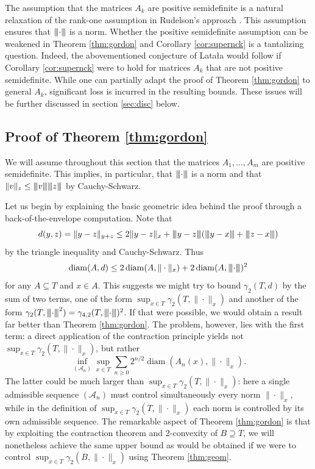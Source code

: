 \documentclass[10pt,reqno]{amsart}
\theoremstyle{definition}
\numberwithin{equation}{section}
\numberwithin{figure}{section}
\numberwithin{table}{section}
\newcommand{\diam}{\mathop{\mathrm{diam}}}
\newcommand{\mynegspace}{\hspace{-0.12em}}
\newcommand{\vvv}{\rvert\mynegspace\rvert\mynegspace\rvert}
\newcommand{\nnn}[1]{{\vvv #1 \vvv}}
\begin{document}
The assumption that the matrices $A_k$ are positive semidefinite is a 
natural relaxation of the rank-one assumption in Rudelson's approach 
\cite{Rud96}. This assumption ensures that $\nnn{\cdot}$ is 
a norm. Whether the positive semidefinite assumption can be weakened in 
Theorem \ref{thm:gordon} and Corollary \ref{cor:supernck} is a tantalizing 
question. Indeed, the abovementioned conjecture of Lata{\l}a \cite{vH16b} 
would follow if Corollary \ref{cor:supernck} were to hold for matrices 
$A_k$ that are not positive semidefinite. While one can partially adapt 
the proof of Theorem \ref{thm:gordon} to general $A_k$, significant loss 
is incurred in the resulting bounds. These issues will be further 
discussed in section \ref{sec:disc} below.

\subsection{Proof of Theorem \ref{thm:gordon}}

We will assume throughout this section that the matrices $A_1,\ldots,A_m$ 
are positive semidefinite. This implies, in particular, that $\nnn{\cdot}$ 
is a norm and that $\|v\|_z\le \nnn{v}\nnn{z}$ by Cauchy-Schwarz.

Let us begin by explaining the basic geometric idea behind the proof 
through a back-of-the-envelope computation. Note that
$$
	d(y,z) = \|y-z\|_{y+z} \le 2\|y-z\|_x + 
	\nnn{y-z}(\nnn{y-x}+\nnn{z-x})
$$
by the triangle inequality and Cauchy-Schwarz. Thus
$$
	\diam(A,d) \le 2\diam(A,\|\cdot\|_x) + 2\diam(A,\nnn{\cdot})^2
$$
for any $A\subseteq T$ and $x\in A$.
This suggests we might try to bound $\gamma_2(T,d)$ by the sum of two 
terms, one of the form $\sup_{x\in T}\gamma_2(T,\|\cdot\|_x)$ and another 
of the form $\gamma_2(T,\nnn{\cdot}^2)=\gamma_{4,2}(T,\nnn{\cdot})^2$. If 
that were possible, we would obtain a result far better than Theorem 
\ref{thm:gordon}. The problem, however, lies with the first term: 
a direct 
application of the contraction principle yields not 
$\sup_{x\in T}\gamma_2(T,\|\cdot\|_x)$, but rather 
$$
	\inf_{(\mathcal{A}_n)}
	\sup_{x\in T}\sum_{n\ge 0}2^{n/2}\diam(A_n(x),\|\cdot\|_x).
$$
The latter could be much larger than $\sup_{x\in T}\gamma_2(T,\|\cdot\|_x)$:
here a single admissible sequence $(\mathcal{A}_n)$ 
must control simultaneously every norm $\|\cdot\|_x$, while in the 
definition of $\sup_{x\in T}\gamma_2(T,\|\cdot\|_x)$ each norm is 
controlled by its own admissible sequence. The remarkable aspect of 
Theorem \ref{thm:gordon} is that by exploiting the contraction 
theorem and 2-convexity of $B\supseteq T$, we will nonetheless achieve the 
same upper bound as would be obtained if we were to control
$\sup_{x\in T}\gamma_2(B,\|\cdot\|_x)$ using Theorem \ref{thm:geom}.
\end{document}
